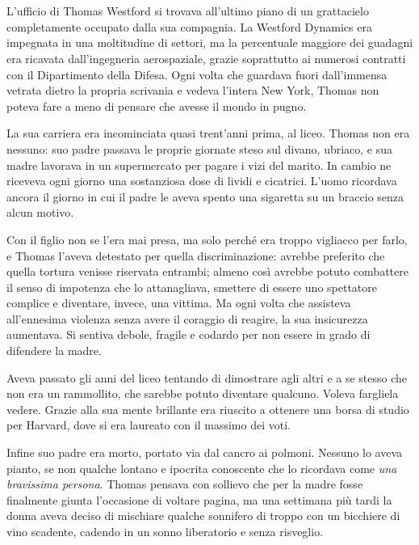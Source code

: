 \chapter{}
\label{ch:1}

L'ufficio di Thomas Westford si trovava all'ultimo piano di un grattacielo completamente occupato
dalla sua compagnia. La Westford Dynamics era impegnata in una moltitudine di settori, ma la
percentuale maggiore dei guadagni era ricavata dall'ingegneria aerospaziale, grazie soprattutto ai
numerosi contratti con il Dipartimento della Difesa. Ogni volta che guardava fuori dall'immensa
vetrata dietro la propria scrivania e vedeva l'intera New York, Thomas non poteva fare a meno di
pensare che avesse il mondo in pugno.

La sua carriera era incominciata quasi trent'anni prima, al liceo. Thomas non era nessuno: suo padre
passava le proprie giornate steso sul divano, ubriaco, e sua madre lavorava in un supermercato per
pagare i vizi del marito. In cambio ne riceveva ogni giorno una sostanziosa dose di lividi e
cicatrici. L'uomo ricordava ancora il giorno in cui il padre le aveva spento una sigaretta su un
braccio senza alcun motivo.

Con il figlio non se l'era mai presa, ma solo perché era troppo vigliacco per farlo, e Thomas
l'aveva detestato per quella discriminazione: avrebbe preferito che quella tortura venisse riservata
entrambi; almeno così avrebbe potuto combattere il senso di impotenza che lo attanagliava, smettere
di essere uno spettatore complice e diventare, invece, una vittima. Ma ogni volta che assisteva
all'ennesima violenza senza avere il coraggio di reagire, la sua insicurezza aumentava. Si sentiva
debole, fragile e codardo per non essere in grado di difendere la madre.

Aveva passato gli anni del liceo tentando di dimostrare agli altri e a se stesso che non era un
rammollito, che sarebbe potuto diventare qualcuno. Voleva fargliela vedere. Grazie alla sua mente
brillante era riuscito a ottenere una borsa di studio per Harvard, dove si era laureato con il
massimo dei voti.

Infine suo padre era morto, portato via dal cancro ai polmoni. Nessuno lo aveva pianto, se non
qualche lontano e ipocrita conoscente che lo ricordava come \emph{una bravissima persona}. Thomas
pensava con sollievo che per la madre fosse finalmente giunta l'occasione di voltare pagina, ma una
settimana più tardi la donna aveva deciso di mischiare qualche sonnifero di troppo con un bicchiere
di vino scadente, cadendo in un sonno liberatorio e senza risveglio.

